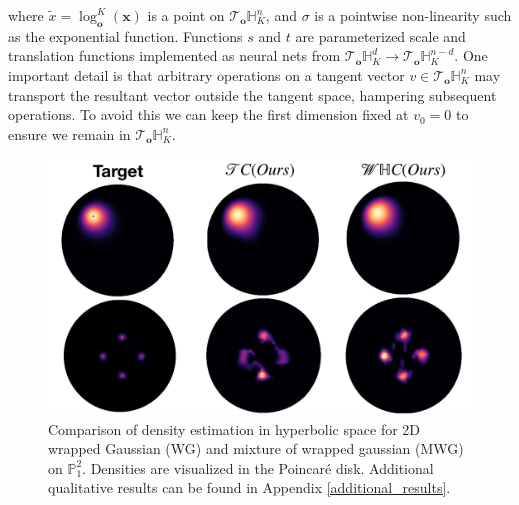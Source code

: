 where $\tilde{x} = \log_{\textbf{o}}^K(\textbf{x})$ is a point on $\mathcal{T}_{\textbf{o}}\mathbb{H}^n_K$, and $\sigma$ is a pointwise non-linearity such as the exponential function. Functions $s$ and $t$ are parameterized scale and translation functions implemented as neural nets from $\mathcal{T}_{\textbf{o}}\mathbb{H}^{d}_K \to \mathcal{T}_{\textbf{o}}\mathbb{H}^{n-d}_K$.
One important detail is that arbitrary operations on a tangent vector $v \in \mathcal{T}_{\textbf{o}}\mathbb{H}^n_K$ may transport the resultant vector outside the tangent space, hampering subsequent operations.
To avoid this we can keep the first dimension fixed at $v_0 = 0$ to ensure we remain in $\mathcal{T}_{\textbf{o}}\mathbb{H}^{n}_K$.

\begin{figure}[t!]
     \centering
     \includegraphics[width=0.95\linewidth]{hyperbolic_density_graphic.pdf}
     \vspace{-10pt}
     \caption{Comparison of density estimation in hyperbolic space for 2D wrapped Gaussian (WG) and mixture of wrapped gaussian (MWG) on $\mathbb{P}^2_1$. Densities are visualized in the Poincar\'e disk. Additional qualitative results can be found in Appendix \ref{additional_results}.}
     \vspace{-10pt}
     \label{fig:density_estimation}
 \end{figure}

